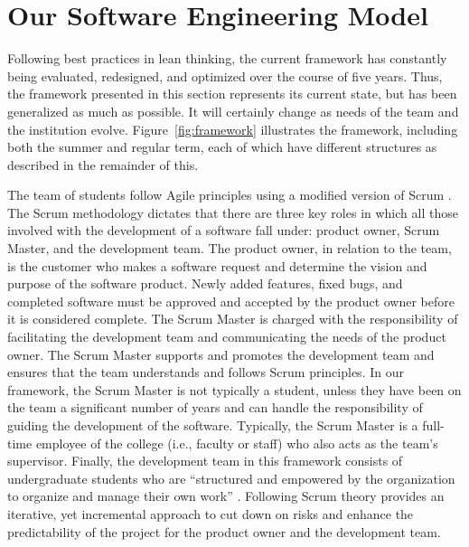 \section{Our Software Engineering Model}

Following best practices in lean thinking, the current framework has  constantly being evaluated, redesigned, and optimized over the course of five years. Thus, the framework presented in this section represents its current state, but has been generalized as much as possible. It will certainly change as needs of the team and the institution evolve. Figure~\ref{fig:framework} illustrates the framework, including both the summer and regular term, each of which have different structures as described in the remainder of this.


The team of students follow Agile principles \cite{agilemanifesto} using a modified version of Scrum \cite{thescrumguide}. The Scrum methodology dictates that there are three key roles in which all those involved with the development of a software fall under: product owner, Scrum Master, and the development team. The product owner, in relation to the team, is the customer who makes a software request and determine the vision and purpose of the software product. Newly added features, fixed bugs, and completed software must be approved and accepted by the product owner before it is considered complete. The Scrum Master is charged with the responsibility of facilitating the development team and communicating the needs of the product owner. The Scrum Master supports and promotes the development team and ensures that the team understands and follows Scrum principles. In our framework, the Scrum Master is not typically a student, unless they have been on the team a significant number of years and can handle the responsibility of guiding the development of the software. Typically, the Scrum Master is a full-time employee of the college (i.e., faculty or staff) who also acts as the team's supervisor. Finally, the development team in this framework consists of undergraduate students who are ``structured and empowered by the organization to organize and manage their own work'' \cite{thescrumguide}. Following Scrum theory provides an iterative, yet incremental approach to cut down on risks and enhance the predictability of the project for the product owner and the development team.

